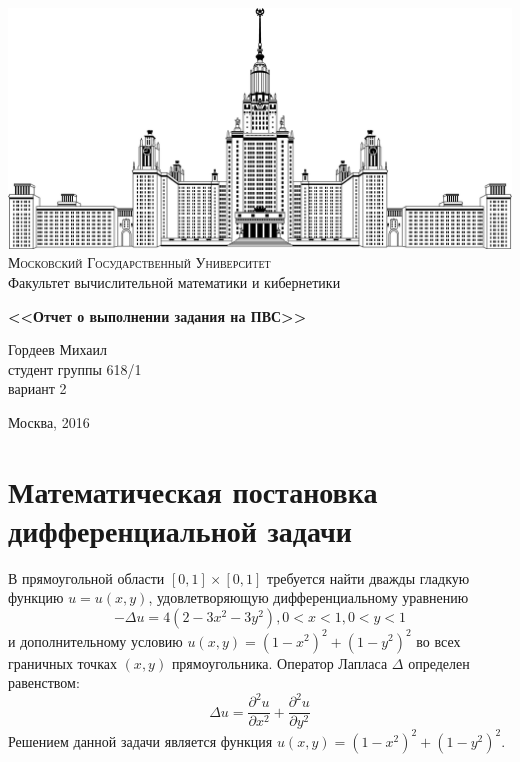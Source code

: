 \documentclass [12pt, a4paper] {article}
\let\stdsection\section
\renewcommand\section{\newpage\stdsection}
\begin{document}
\thispagestyle {empty}

\begin {center}
    \ \vspace{-4cm}

    \includegraphics [width = 0.5 \textwidth] {msu.png} \\
    {\scshape Московский Государственный Университет} \\
    Факультет вычислительной математики и кибернетики\\

    \vspace {5cm}



    {\Huge \bfseries
    <<Отчет о выполнении задания на ПВС>> \\}
\end {center}

\vfill
\vfill

\begin {flushright}
    \large
    Гордеев Михаил \\
    студент группы 618/1 \\
    вариант 2 \\

    \vspace {5mm}
\end {flushright}

\vfill

\begin {center}
    Москва, 2016
\end {center}

\enlargethispage {4 \baselineskip}


\section{Математическая постановка дифференциальной задачи} В прямоугольной
области $[0,1] \times [0,1]$ требуется найти дважды гладкую функцию $u =
u(x,y)$, удовлетворяющую дифференциальному уравнению $$ -\Delta{u} = 4(2 - 3x^2
- 3y^2), 0<x<1, 0<y<1 $$ и дополнительному условию $u(x,y) = (1-x^2)^2 +
(1-y^2)^2$ во всех граничных точках $(x, y)$ прямоугольника.  Оператор Лапласа
$\Delta$ определен равенством: $$ \Delta{u} = \frac{\partial^2u}{\partial{x^2}}
+ \frac{\partial^2u}{\partial{y^2}} $$ Решением данной задачи является функция
$u(x,y) = (1-x^2)^2 + (1-y^2)^2$.
\end{document}
